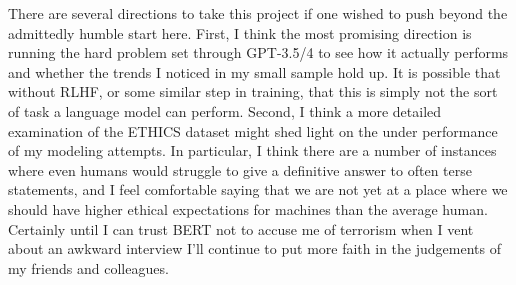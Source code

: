 \documentclass[11pt,a4paper]{article}
\begin{document}
There are several directions to take this project if one wished to push beyond the admittedly humble start here. First, I think the most promising direction is running the hard problem set through GPT-3.5/4 to see how it actually performs and whether the trends I noticed in my small sample hold up. It is possible that without RLHF, or some similar step in training, that this is simply not the sort of task a language model can perform. Second, I think a more detailed examination of the ETHICS dataset might shed light on the under performance of my modeling attempts. In particular, I think there are a number of instances where even humans would struggle to give a definitive answer to often terse statements, and I feel comfortable saying that we are not yet at a place where we should have higher ethical expectations for machines than the average human. Certainly until I can trust BERT not to accuse me of terrorism when I vent about an awkward interview I'll continue to put more faith in the judgements of my friends and colleagues.



\end{document}
